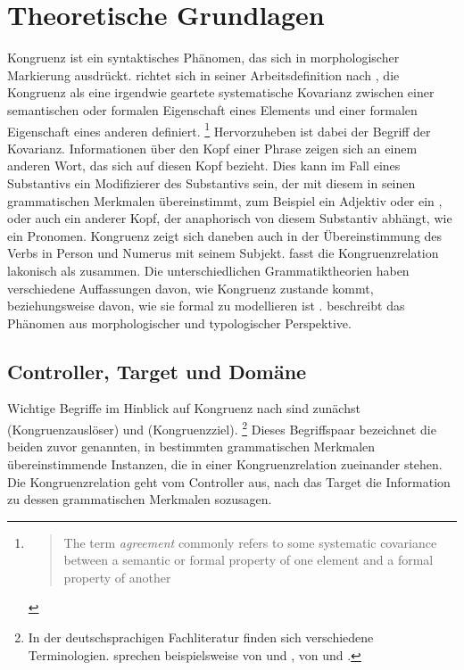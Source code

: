 \chapter{Theoretische Grundlagen}
\label{ch:theorie}

Kongruenz ist ein syntaktisches Phänomen, das sich in morphologischer
Markierung ausdrückt. \citet{corbett2006} richtet sich in seiner
Arbeitsdefinition nach \citet[610]{steele1978}, die Kongruenz als eine
irgendwie geartete systematische Kovarianz zwischen einer semantischen oder
formalen Eigenschaft eines Elements und einer formalen Eigenschaft eines
anderen definiert.%
%
	\footnote{\blockcquote[610]{steele1978}{The term \emph{agreement} commonly
		refers to some systematic covariance between a semantic or formal
		property of one element and a formal property of another}.%
	}
%
Hervorzuheben ist dabei der Begriff der Kovarianz. Informationen über den Kopf
einer Phrase zeigen sich an einem anderen Wort, das sich auf diesen Kopf
bezieht. Dies kann im Fall eines Substantivs ein Modifizierer des Substantivs
sein, der mit diesem in seinen grammatischen Merkmalen übereinstimmt, zum
Beispiel ein Adjektiv oder ein , oder auch
ein anderer Kopf, der anaphorisch von diesem Substantiv abhängt,
wie ein Pronomen. Kongruenz zeigt sich daneben auch in der Übereinstimmung des
Verbs in Person und Numerus mit seinem Subjekt. \citet[20]{corbett2006} fasst
die Kongruenzrelation lakonisch als  zusammen. Die unterschiedlichen Grammatiktheorien
haben verschiedene Auffassungen davon, wie Kongruenz zustande kommt,
beziehungsweise davon, wie sie formal zu modellieren ist
\autocite[siehe~z.\,B.][]{mueller2023}. \citeauthor{corbett2006} beschreibt das
Phänomen aus morphologischer und typologischer Perspektive.

\section{Controller, Target und Domäne}
\label{sec:ctrltarg}


Wichtige Begriffe im Hinblick auf Kongruenz nach \citet{corbett2006} sind
zunächst  (Kongruenzauslöser) und  (Kongruenzziel).%
%
	\footnote{In der deutschsprachigen Fachliteratur finden sich verschiedene
	Terminologien. \citet{fleischerschallert2011} sprechen beispielsweise von
	 und , \citet{panther2009} von
	 und .}
%
Dieses Begriffspaar bezeichnet die beiden zuvor genannten, in bestimmten
grammatischen Merkmalen übereinstimmende Instanzen, die in einer
Kongruenzrelation zueinander stehen. Die Kongruenzrelation geht vom Controller
aus, nach \citeauthor{corbett2006}  das Target die Information zu
dessen grammatischen Merkmalen sozusagen.

